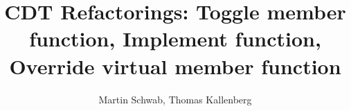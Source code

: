\documentclass[a4paper,10pt]{scrreprt}
\title{CDT Refactorings: Toggle member function, Implement function, Override virtual member function}
\author{Martin Schwab, Thomas Kallenberg}
\begin{document}
\maketitle



\begin{abstract}
\end{abstract}
\end{document}
